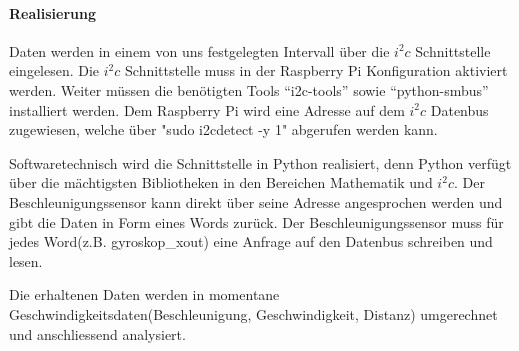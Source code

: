 \documentclass[../../main.tex]{subfiles}
\begin{document}
\paragraph{Realisierung}
Daten werden in einem von uns festgelegten Intervall über die $i^2c$ Schnittstelle eingelesen. Die $i^2c$ Schnittstelle muss in der Raspberry Pi Konfiguration aktiviert werden. Weiter müssen die benötigten Tools ``i2c-tools'' sowie ``python-smbus'' installiert werden. Dem Raspberry Pi wird eine Adresse auf dem $i^2c$ Datenbus zugewiesen, welche über "sudo i2cdetect -y 1" abgerufen werden kann.

Softwaretechnisch wird die Schnittstelle in Python realisiert, denn Python verfügt über die mächtigsten Bibliotheken in den Bereichen Mathematik und $i^2c$. Der Beschleunigungssensor kann direkt über seine Adresse angesprochen werden und gibt die Daten in Form eines Words zurück. Der Beschleunigungssensor muss für jedes Word(z.B. gyroskop\_xout) eine Anfrage auf den Datenbus schreiben und lesen.

Die erhaltenen Daten werden in momentane Geschwindigkeitsdaten(Beschleunigung, Geschwindigkeit, Distanz) umgerechnet und anschliessend analysiert.
\end{document}
